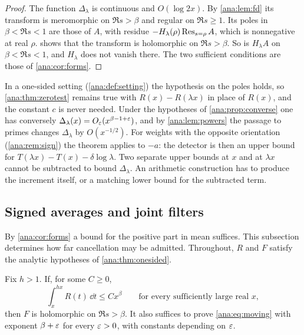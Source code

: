 \begin{proof}
The function $\Delta_\lambda$ is continuous and $O(\log 2x)$. By \cref{ana:lem:fd} its
transform is meromorphic on $\Re s>\beta$ and regular on $\Re s\ge1$. Its poles in
$\beta<\Re s<1$ are those of $A$, with residue $-H_\lambda(\rho)\operatorname{Res}_{s=\rho}A$, which is
nonnegative at real $\rho$.  shows that the transform is holomorphic on
$\Re s>\beta$. So is $H_\lambda A$ on $\beta<\Re s<1$, and $H_\lambda$ does not vanish there.
The two sufficient conditions are those of \cref{ana:cor:forms}.
\end{proof}

In a one-sided setting (\cref{ana:def:setting}) the hypothesis on the poles holds, so
\cref{ana:thm:zerotest} remains true with $R(x)-R(\lambda x)$ in place of $R(x)$, and the
constant $c$ is never needed. Under the hypotheses of \cref{ana:prop:converse} one has
conversely $\Delta_\lambda(x)=O_\varepsilon(x^{\beta-1+\varepsilon})$, and by \cref{ana:lem:powers} the
passage to primes changes $\Delta_\lambda$ by $O(x^{-1/2})$. For weights with the opposite
orientation (\cref{ana:rem:sign}) the theorem applies to $-a$: the detector is then an upper
bound for $T(\lambda x)-T(x)-\delta\log\lambda$. Two separate upper bounds at $x$ and at
$\lambda x$ cannot be subtracted to bound $\Delta_\lambda$. An arithmetic construction has to
produce the increment itself, or a matching lower bound for the subtracted term.

\subsection{Signed averages and joint filters}\label{ana:sec:mean}
{\raggedright{}}

By \cref{ana:cor:forms} a bound for the positive part in mean suffices. This subsection
determines how far cancellation may be admitted. Throughout, $R$ and $F$ satisfy the analytic
hypotheses of \cref{ana:thm:onesided}.

\begin{theorem}\label{ana:thm:moving}
Fix $h>1$. If, for some $C\ge0$,
\begin{equation}\label{ana:eq:moving}
 \int_x^{hx}R(t)\,\dd t\le Cx^{\beta}\qquad\text{for every sufficiently large real }x,
\end{equation}
then $F$ is holomorphic on $\Re s>\beta$. It also suffices to prove \eqref{ana:eq:moving} with
exponent $\beta+\varepsilon$ for every $\varepsilon>0$, with constants depending on $\varepsilon$.
\end{theorem}

